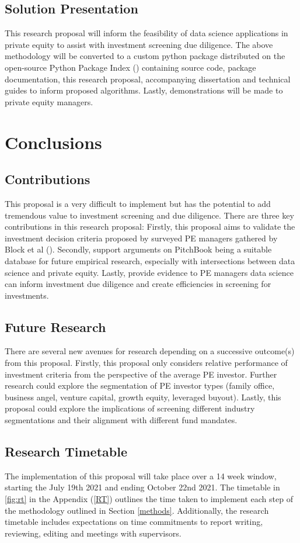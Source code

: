\documentclass[12pt]{article}
\begin{document}
\subsection{Solution Presentation} \label{method-launch}
This research proposal will inform the feasibility of data science applications in private equity to assist with investment screening due diligence.
The above methodology will be converted to a custom python package distributed on the open-source Python Package Index (\citeyear{PYPL_Pop}) 
containing source code, package documentation, this research proposal, accompanying dissertation and technical guides to inform proposed algorithms.
Lastly, demonstrations will be made to private equity managers.
\section{Conclusions}\label{conclusions}
\subsection{Contributions}
This proposal is a very difficult to implement but has the potential to add tremendous value to investment screening and due diligence.
There are three key contributions in this research proposal:
Firstly, this proposal aims to validate the investment decision criteria proposed by surveyed PE managers gathered by Block et al (\citeyear{BLOCK2019329}).
Secondly, support arguments on PitchBook being a suitable database for future empirical research, especially with intersections between data science and private equity.
Lastly, provide evidence to PE managers data science can inform investment due diligence and create efficiencies in screening for investments.
\subsection{Future Research}
There are several new avenues for research depending on a successive outcome(s) from this proposal.
Firstly, this proposal only considers relative performance of investment criteria from the perspective of the average PE investor.
Further research could explore the segmentation of PE investor types (family office, business angel, venture capital, growth equity, leveraged buyout).
Lastly, this proposal could explore the implications of screening different industry segmentations and their alignment with different fund mandates.
\subsection{Research Timetable}
The implementation of this proposal will take place over a 14 week window, starting the July 19th 2021 and ending October 22nd 2021.
The timetable in \ref{fig:rt} in the Appendix (\ref{RT}) outlines the time taken to implement each step of the methodology outlined in Section \ref{methods}.
Additionally, the research timetable includes expectations on time commitments to report writing, reviewing, editing and meetings with supervisors.
\newpage
\printbibliography
\newpage
\end{document}
